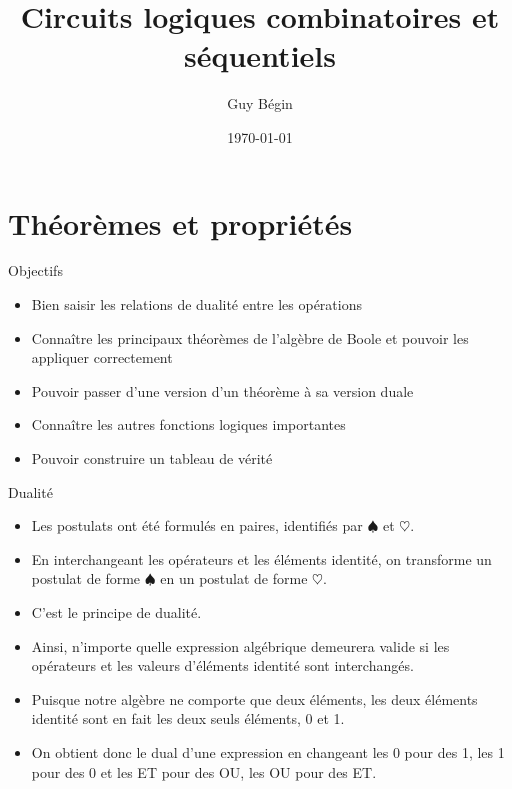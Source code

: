 \documentclass[presentation]{beamer}
\author{Guy Bégin}
\date{\today}
\title{Circuits logiques combinatoires et séquentiels}
\begin{document}
\maketitle


\section{Théorèmes et propriétés}
\label{sec:orgd3769e9}
\begin{frame}[label={sec:org4e97259}]{Objectifs}
\begin{itemize}
\item Bien saisir les relations de dualité entre les opérations
\item Connaître les principaux théorèmes de l'algèbre de Boole et pouvoir
les appliquer correctement
\item Pouvoir passer d'une version d'un théorème à sa version duale
\item Connaître les autres fonctions logiques importantes
\item Pouvoir construire un tableau de vérité
\end{itemize}
\end{frame}

\begin{frame}[label={sec:org960e1d1}]{Dualité}
\begin{itemize}
\item Les postulats ont été formulés en paires, identifiés par \(\spadesuit\) et \(\heartsuit\).

\item En interchangeant les opérateurs et les éléments identité, on transforme un postulat de forme \(\spadesuit\) en un postulat de forme \(\heartsuit\).

\item C'est le principe de \alert{dualité}.

\item Ainsi, n'importe quelle expression algébrique demeurera valide si les opérateurs et les valeurs d'éléments identité sont interchangés.

\item Puisque notre algèbre ne comporte que deux éléments, les deux éléments identité sont en fait les deux seuls éléments, 0 et 1.

\item On obtient donc le dual d'une expression en changeant les 0 pour des 1, les 1 pour des 0 et les ET pour des OU, les OU pour des ET.
\end{itemize}
\end{frame}
\end{document}
